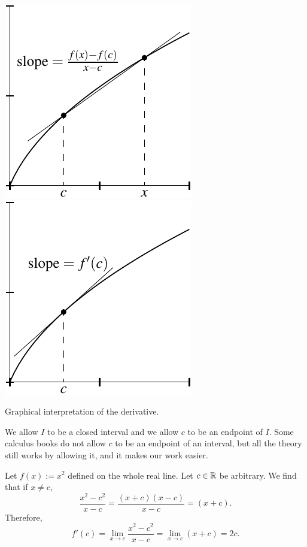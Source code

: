 \begin{myfigureht}
\includegraphics{figures/derivdfig}
\qquad
\includegraphics{figures/derivfig}
\caption{Graphical interpretation of the derivative.\label{derivfig}}
\end{myfigureht}

We allow $I$ to be a closed interval and we allow
$c$ to be an endpoint of $I$.  Some calculus books do not allow $c$ to be an
endpoint of an interval, but all the theory still works by allowing it, and
it makes our work easier.

\begin{example}
Let $f(x) := x^2$ defined on the whole real line.  Let $c \in {\mathbb{R}}$ be arbitrary.  We find that if
$x \not=c$,
\begin{equation*}
\frac{x^2-c^2}{x-c} =
\frac{(x+c)(x-c)}{x-c} =
(x+c) .
\end{equation*}
Therefore,
\begin{equation*}
f'(c) = 
\lim_{x\to c} \frac{x^2-c^2}{x-c} =
\lim_{x\to c} (x+c) = 2c.
\end{equation*}
\end{example}

